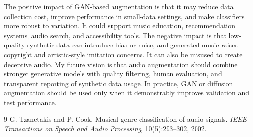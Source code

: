 \documentclass[10pt,twocolumn,letterpaper]{article}
\begin{document}
The positive impact of GAN-based augmentation is that it may reduce data collection cost, improve performance in small-data settings, and make classifiers more robust to variation. It could support music education, recommendation systems, audio search, and accessibility tools. The negative impact is that low-quality synthetic data can introduce bias or noise, and generated music raises copyright and artistic-style imitation concerns. It can also be misused to create deceptive audio. My future vision is that audio augmentation should combine stronger generative models with quality filtering, human evaluation, and transparent reporting of synthetic data usage. In practice, GAN or diffusion augmentation should be used only when it demonstrably improves validation and test performance.

{\small

\begin{thebibliography}{9}
G. Tzanetakis and P. Cook. Musical genre classification of audio signals. \emph{IEEE Transactions on Speech and Audio Processing}, 10(5):293--302, 2002.
\end{thebibliography}
}
\end{document}
